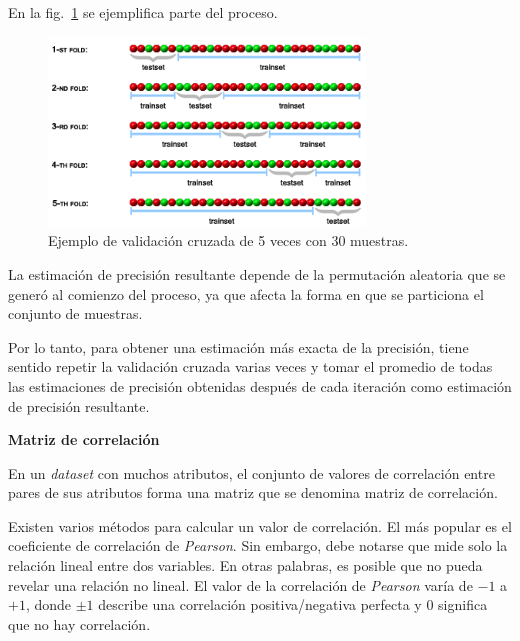 \documentclass[a4paper,12pt]{article}
\begin{document}
En la fig.~\ref{fig:kfolds} se ejemplifica parte del proceso.

\begin{figure}[H]
	\begin{center}
	\includegraphics[width=0.75\textwidth]{tesis_67.png}
  	\caption{Ejemplo de validación cruzada de 5 veces con 30 muestras.}
  	\label{fig:kfolds}
  	\end{center}
\end{figure}

La estimación de precisión resultante depende de la permutación aleatoria que se generó al comienzo del proceso, ya que afecta la forma en que se particiona el conjunto de muestras. 

Por lo tanto, para obtener una estimación más exacta de la precisión, tiene sentido repetir la validación cruzada varias veces y tomar el promedio de todas las estimaciones de precisión obtenidas después de cada iteración como estimación de precisión resultante.

\begin{python}

\end{python}

\textbf{Matriz de correlación}

En un \textit{dataset} con muchos atributos, el conjunto de valores de correlación entre pares de sus atributos forma una matriz que se denomina matriz de correlación.

Existen varios métodos para calcular un valor de correlación. El más popular es el coeficiente de correlación de \textit{Pearson}. Sin embargo, debe notarse que mide solo la relación lineal entre dos variables. En otras palabras, es posible que no pueda revelar una relación no lineal. El valor de la correlación de \textit{Pearson} varía de $-1$ a $+1$, donde $\pm1$ describe una correlación positiva/negativa perfecta y $0$ significa que no hay correlación. \citep{corrmatrix}
\end{document}
